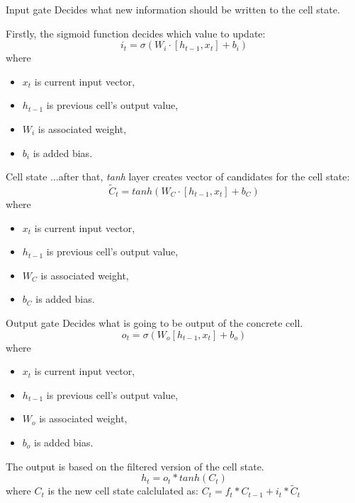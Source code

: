\documentclass{beamer}
\begin{document}
  \begin{frame}{Input gate}
    Decides what new information should be written to the cell state. 
    
    Firstly, the sigmoid function decides which value to update:
    $$ i_{t} = \sigma (W_{i} \cdot [h_{t-1}, x_{t}] + b_{i}) $$ 
    where
    \begin{itemize}
      \item[] $ x_{t} $ is current input vector,
      \item[] $ h_{t-1} $ is previous cell's output value,
      \item[] $ W_{i} $ is associated weight,
      \item[] $ b_{i} $ is added bias.
    \end{itemize}
  \end{frame}

  \begin{frame}{Cell state}
    ...after that, \textit{tanh} layer creates vector of candidates for the cell state:
    $$ \tilde{C}_{t} = tanh (W_{C} \cdot [h_{t-1}, x_{t}] + b_{C}) $$
    where
    \begin{itemize}
      \item[] $ x_{t} $ is current input vector,
      \item[] $ h_{t-1} $ is previous cell's output value,
      \item[] $ W_{C} $ is associated weight,
      \item[] $ b_{C} $ is added bias.
    \end{itemize}
  \end{frame}

  \begin{frame}{Output gate}
    Decides what is going to be output of the concrete cell. 
    $$ o_{t} = \sigma (W_{o} [h_{t-1}, x_{t}] + b_{o}) $$ 
    where
    \begin{itemize}
      \item[] $ x_{t} $ is current input vector,
      \item[] $ h_{t-1} $ is previous cell's output value,
      \item[] $ W_{o} $ is associated weight,
      \item[] $ b_{o} $ is added bias.
    \end{itemize}
    
    The output is based on the filtered version of the cell state.
    $$ h_{t} = o_{t} * tanh(C_{t})$$
    where 
    $ C_{t} $ is the new cell state calclulated as:
    $ C_{t} = f_{t} * C_{t-1} + i_{t} * \tilde{C}_{t} $
  \end{frame}
\end{document}
